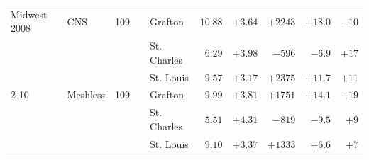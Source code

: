 \begin{table}[htbp]
\begin{tabular}{llrrlrrrrr}
\midrule
Midwest 2008 & CNS & 109 &  & Grafton & $10.88$ & \boldmath$+3.64$ & $+2243$ & $+18.0$ & \boldmath$-10$ \\
 &  &  &  & St. Charles & $6.29$ & \boldmath$+3.98$ & \boldmath$-596$ & \boldmath$-6.9$ & $+17$ \\
 &  &  &  & St. Louis & $9.57$ & \boldmath$+3.17$ & $+2375$ & $+11.7$ & $+11$ \\
\cmidrule(l){2-10}
 & Meshless & 109 &  & Grafton & \boldmath$9.99$ & $+3.81$ & \boldmath$+1751$ & \boldmath$+14.1$ & $-19$ \\
 &  &  &  & St. Charles & \boldmath$5.51$ & $+4.31$ & $-819$ & $-9.5$ & \boldmath$+9$ \\
 &  &  &  & St. Louis & \boldmath$9.10$ & $+3.37$ & \boldmath$+1333$ & \boldmath$+6.6$ & \boldmath$+7$ \\
\bottomrule
\end{tabular}
\end{table}
